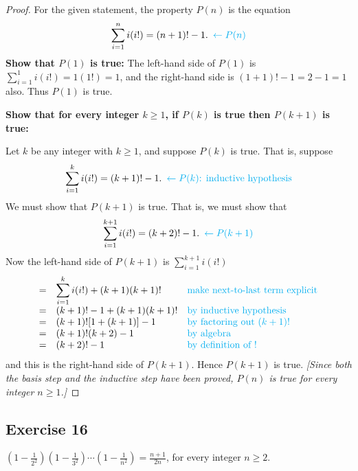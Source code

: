 \documentclass[14pt]{extarticle}
\newcommand{\dps}{\displaystyle}
\newcommand{\from}{\leftarrow}
\newcommand{\cy}{\color{cyan}}
\begin{document}
\begin{proof}
For the given statement, the property $P(n)$ is the equation
\[
\dps \sum_{i=1}^{n}i(i!) = (n+1)! - 1. \,\,\, {\cy \from P(n)}
\]
{\bf Show that $P(1)$ is true:} The left-hand side of $P(1)$ is $\dps \sum_{i=1}^{1}i(i!) = 1(1!) = 1$, and the right-hand side is $(1+1)! - 1 = 2 - 1 = 1$ also. Thus $P(1)$ is true.

{\bf Show that for every integer $k \geq 1$, if $P(k)$ is true then $P(k + 1)$ is true:}

Let $k$ be any integer with $k \geq 1$, and suppose $P(k)$ is true. That is, suppose
\[
\dps \sum_{i=1}^{k}i(i!) = (k+1)! - 1. \,\,\, {\cy \from P(k) \text{: inductive hypothesis}}
\]
We must show that $P(k + 1)$ is true. That is, we must show that
\[
\dps \sum_{i=1}^{k+1}i(i!) = (k+2)! - 1. \,\,\,{\cy \from P(k+1)}
\]
Now the left-hand side of $P(k + 1)$ is $\sum_{i=1}^{k+1}i(i!)$
\[
\begin{array}{lll}
= & \dps \sum_{i=1}^{k}i(i!) + (k+1)(k+1)! & \text{\cy make next-to-last term explicit} \\
= & (k+1)! - 1 + (k+1)(k+1)! & \text{\cy by inductive hypothesis} \\
= & (k+1)![1 + (k+1)] - 1 & \text{\cy by factoring out $(k+1)!$} \\
= & (k+1)!(k+2) - 1 & \text{\cy by algebra} \\
= & (k+2)! - 1 & \text{\cy by definition of !}
\end{array}
\]
and this is the right-hand side of $P(k + 1)$. Hence $P(k + 1)$ is true. {\it [Since both the basis step and the inductive step have been proved, $P(n)$ is true for every integer $n \geq 1$.]}
\end{proof}

\subsection{Exercise 16}
$\dps \left(1 - \frac{1}{2^2}\right)\left(1 - \frac{1}{3^2}\right) \cdots \left(1 - \frac{1}{n^2}\right) = \frac{n+1}{2n}$, for every integer $n \geq 2$.
\end{document}
